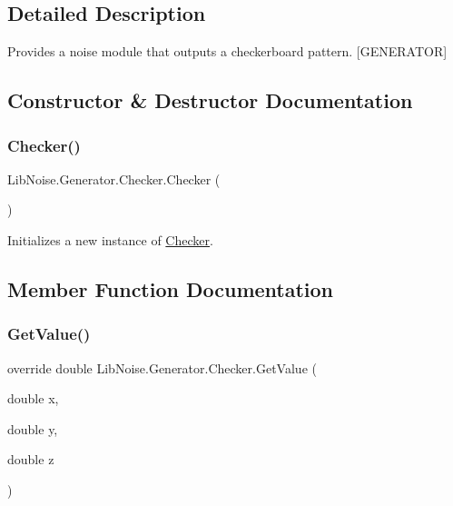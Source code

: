 \subsection{Detailed Description}
Provides a noise module that outputs a checkerboard pattern. \mbox{[}G\+E\+N\+E\+R\+A\+T\+OR\mbox{]} 



\subsection{Constructor \& Destructor Documentation}
\mbox{\label{class_lib_noise_1_1_generator_1_1_checker_a7eb7717054d1f266b10174e320da60e2}} 
\subsubsection{\texorpdfstring{Checker()}{Checker()}}
{\footnotesize\ttfamily Lib\+Noise.\+Generator.\+Checker.\+Checker (\begin{DoxyParamCaption}{ }\end{DoxyParamCaption})}



Initializes a new instance of \hyperlink{class_lib_noise_1_1_generator_1_1_checker}{Checker}. 



\subsection{Member Function Documentation}
\mbox{\label{class_lib_noise_1_1_generator_1_1_checker_a26a849564ad34925c60be7b4529d4263}} 
\subsubsection{\texorpdfstring{Get\+Value()}{GetValue()}}
{\footnotesize\ttfamily override double Lib\+Noise.\+Generator.\+Checker.\+Get\+Value (\begin{DoxyParamCaption}\item[{double}]{x,  }\item[{double}]{y,  }\item[{double}]{z }\end{DoxyParamCaption})\hspace{0.3cm}{\ttfamily [virtual]}}



